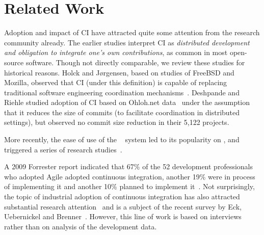 
\section{Related Work}
\label{sec:rw}

Adoption and impact of CI have attracted quite some attention from the research 
community already. 
The earlier studies interpret CI as \emph{distributed development and obligation 
to integrate one's own contributions}, as common in most open-source software.
Though not directly comparable, we review these studies for historical reasons.
Holck and J{\o}rgensen, based on studies of FreeBSD and Mozilla, observed that 
CI (under this definition) is capable of replacing traditional software engineering 
coordination mechanisms~\cite{HolckJ03}.  
Deshpande and Riehle studied adoption of CI based on Ohloh.net data~\cite{Deshpande2008}
under the assumption that it reduces the size of commits (to facilitate coordination
in distributed settings), but observed no commit size reduction in their 5,122 projects. 

More recently, the ease of use of the \Tvis~\cite{TravisCI} system led to its 
popularity on \GH, and triggered a series of research studies~\cite{era14, 
VasilescuYWDF15, yue2015wait, BellerGZ16, Hilton2016, Yu2016}.


A 2009 Forrester report indicated that 67\% of the 52 development professionals
who adopted Agile adopted continuous integration, another 19\% were in process 
of implementing it and another 10\% planned to implement it~\cite{Forrester}. 
Not surprisingly, the topic of industrial adoption of continuous integration 
has also attracted substantial research attention~\cite{Leppanen2015,Laukkanen2015Agile,Debbiche2014,Stahl2014ICSEComp,Stahl2014JSS} and is a subject of the recent survey by Eck, Uebernickel and Brenner~\cite{EckUB14}. 
However, this line of work is based on interviews rather than on analysis of the development data.

